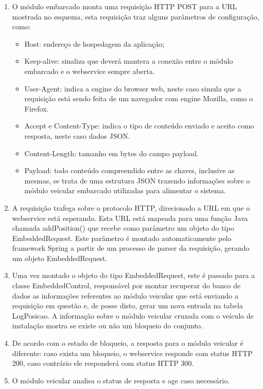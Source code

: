 \begin{enumerate}
	\item O módulo embarcado monta uma requisição HTTP POST para a URL mostrada no esquema, esta requisição traz alguns parâmetros de configuração, como:
	\begin{itemize}
		\item Host: endereço de hospedagem da aplicação;
		\item Keep-alive: sinaliza que deverá mantera a conexão entre o módulo embarcado e o webservice sempre aberta.
		\item User-Agent: indica a engine do browser web, neste caso simula que a requisição está sendo feita de um navegador com engine Mozilla, como o Firefox.
		\item Accept e Content-Type: indica o tipo de conteúdo enviado e aceito como resposta, neste caso dados JSON.
		\item Content-Length: tamanho em bytes do campo payload.
		\item Payload: todo conteúdo compreendido entre as chaves, inclusive as mesmas, se trata de uma estrutura JSON trazendo informações sobre o módulo veicular embarcado utilizadas para alimentar o sistema. 
	\end{itemize}
	
	\item A requisição trafega sobre o protocolo HTTP, direcionado a URL em que o webservice está esperando. Esta URL está mapeada para uma função Java chamada addPosition() que recebe como parâmetro um objeto do tipo EmbeddedRequest. Este parâmetro é montado automaticamente pelo framework Spring a partir de um processo de parser da requisição, gerando um objeto EmbeddedRequest.
	\item Uma vez montado o objeto do tipo EmbeddedRequest, este é passado para a classe EmbeddedControl, responsável por montar recuperar do banco de dados as informações referentes ao módulo veicular que está enviando a requisição em questão e, de posse disto, gerar um nova entrada na tabela LogPosicao. A informação sobre o módulo veicular cruzada com o veículo de instalação mostra se existe ou não um bloqueio do conjunto.
	\item De acordo com o estado de bloqueio, a resposta para o módulo veicular é diferente: caso exista um bloqueio, o webservice responde com status HTTP 200, caso contrário ele responderá com status HTTP 300.
	\item O módulo veicular analisa o status de resposta e age caso necessário.
\end{enumerate}

